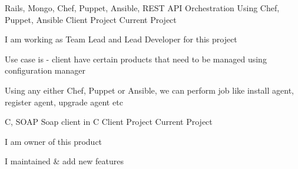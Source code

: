 

\begin{cventries}


  \cventry
    {Rails, Mongo, Chef, Puppet, Ansible, REST API} %
    {Orchestration Using Chef, Puppet, Ansible} %
    {Client Project} %
    {Current Project} %
    {
      \begin{cvitems} %
        \item {I am working as Team Lead and Lead Developer for this project}
        \item {Use case is - client have certain products that need to be managed using configuration manager}
        \item {Using any either Chef, Puppet or Ansible, we can perform job like install agent, register agent, upgrade agent etc}
      \end{cvitems}
    }

  \cventry
    {C, SOAP} %
    {Soap client in C} %
    {Client Project} %
    {Current Project} %
    {
      \begin{cvitems} %
        \item {I am owner of this product}
        \item {I maintained \& add new features}
      \end{cvitems}
    }


\end{cventries}
